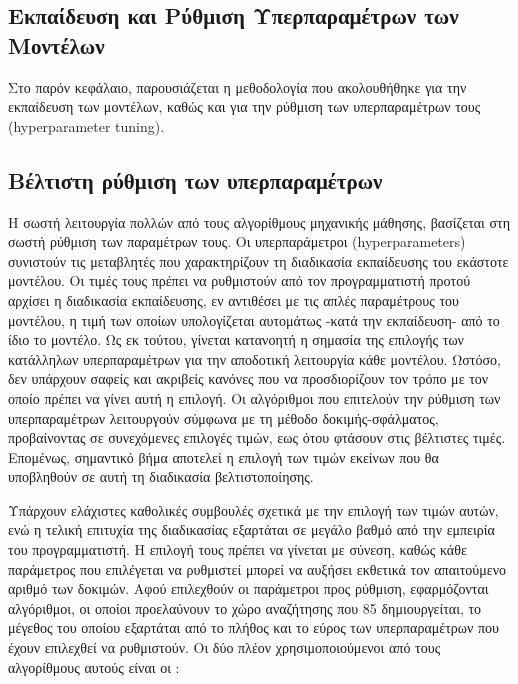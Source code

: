 \documentclass[diploma]{softlab-thesis}
\begin{document}
\begin{enumerate}
\begin{enumerate}
\section{Εκπαίδευση και Ρύθμιση Υπερπαραμέτρων των Μοντέλων}

Στο παρόν κεφάλαιο, παρουσιάζεται η μεθοδολογία που ακολουθήθηκε για την εκπαίδευση των μοντέλων, καθώς και για την ρύθμιση των υπερπαραμέτρων τους (hyperparameter tuning).

\subsection{Βέλτιστη ρύθμιση των υπερπαραμέτρων}

Η σωστή λειτουργία πολλών από τους αλγορίθμους μηχανικής μάθησης, βασίζεται στη σωστή ρύθμιση των παραμέτρων τους. Οι υπερπαράμετροι (hyperparameters) συνιστούν τις μεταβλητές που χαρακτηρίζουν τη διαδικασία εκπαίδευσης του εκάστοτε μοντέλου. Οι τιμές τους πρέπει να ρυθμιστούν από τον προγραμματιστή προτού αρχίσει η διαδικασία εκπαίδευσης, εν αντιθέσει με τις απλές παραμέτρους του μοντέλου, η τιμή των οποίων υπολογίζεται αυτομάτως -κατά την εκπαίδευση- από το ίδιο το μοντέλο. Ως εκ τούτου, γίνεται κατανοητή η σημασία της επιλογής των κατάλληλων υπερπαραμέτρων για την αποδοτική λειτουργία κάθε μοντέλου. Ωστόσο, δεν υπάρχουν σαφείς και ακριβείς κανόνες που να προσδιορίζουν τον τρόπο με τον οποίο πρέπει να γίνει αυτή η επιλογή. Οι αλγόριθμοι που επιτελούν την ρύθμιση των υπερπαραμέτρων λειτουργούν σύμφωνα με τη μέθοδο δοκιμής-σφάλματος, προβαίνοντας σε συνεχόμενες επιλογές τιμών, εως ότου φτάσουν στις βέλτιστες τιμές. Επομένως, σημαντικό βήμα αποτελεί η επιλογή των τιμών εκείνων που θα υποβληθούν σε αυτή τη διαδικασία βελτιστοποίησης.

Υπάρχουν ελάχιστες καθολικές συμβουλές σχετικά με την επιλογή των τιμών αυτών, ενώ η τελική επιτυχία της
διαδικασίας εξαρτάται σε μεγάλο βαθμό από την εμπειρία του προγραμματιστή. Η επιλογή τους πρέπει να γίνεται με σύνεση, καθώς κάθε παράμετρος που επιλέγεται να ρυθμιστεί μπορεί να αυξήσει εκθετικά τον απαιτούμενο αριθμό των δοκιμών. Αφού επιλεχθούν οι παράμετροι προς ρύθμιση, εφαρμόζονται αλγόριθμοι, οι οποίοι προελαύνουν το χώρο αναζήτησης που 85 δημιουργείται, το μέγεθος του οποίου εξαρτάται από το πλήθος και το εύρος των υπερπαραμέτρων που έχουν επιλεχθεί να ρυθμιστούν. Οι δύο πλέον χρησιμοποιούμενοι από τους αλγορίθμους αυτούς είναι οι : 


\end{enumerate}
\end{enumerate}
\end{document}
